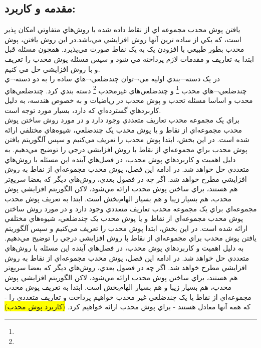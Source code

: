 \documentclass{book}
\begin{document}
\subsection*{مقدمه و کاربرد:}
 يافتن پوش محدب مجموعه اي از  نقاط داده شده با روش‌هاي متفاوتي امکان پذير است، که يکي از ساده ترين آنها روش افزايشي مي‌باشد.در اين روش يافتن، پوش محدب بطور طبيعي با افزودن يک به يک نقاط صورت مي‌پذيرد. همچون مسئله قبل ابتدا به تعاريف و مقدمات لازم پرداخته مي شود و سپس مسئله پوش محدب را تعريف و با روش افزايشي حل مي کنيم.\\
 در يک دسته¬بندي اوليه مي¬توان چندضلعي¬هاي ساده را به دو دسته¬ي چندضلعي¬هاي محدب  
 \footnote{}
 و چندضلعي‌هاي غيرمحدب  
 \footnote{}
 دسته بندي کرد. چندضلعي‌هاي محدب و اساسا مسئله تحدب و پوش محدب در رياضيات و به خصوص هندسه، به دليل کاربردهاي گسترده‌اي که دارد، بسيار مورد توجه است. \\
 براي يک مجموعه محدب تعاريف متعددي وجود دارد و در مورد روش ساختن پوش محدب مجموعه‌اي از نقاط و يا پوش محدب يک چندضلعي، شيوه‌هاي مختلفي ارائه شده است.  در اين بخش، ابتدا پوش محدب را تعريف مي‌کنيم و سپس آلگوريتم يافتن پوش محدب براي مجموعه‌اي از نقاط با روش افزايشي درجي را توضيح مي‌دهيم. به دليل اهميت و کاربردهاي پوش محدب، در فصل‌هاي آينده اين مسئله با روش‌هاي متعددي حل خواهد شد. در ادامه اين فصل، پوش محدب مجموعه‌اي از نقاط به روش افزايشي مطرح خواهد شد. اگر چه در فصول بعدي، روش‌هاي ديگر که بعضا سريع‌تر هم هستند، براي ساختن پوش محدب ارائه مي‌شود، لاکن الگوريتم افزايشي پوش محدب، هم بسيار زيبا و هم بسيار الهام‌بخش است. ابتدا به تعريف پوش محدب مجموعه‌اي براي يک مجموعه محدب تعاريف متعددي وجود دارد و در مورد روش ساختن پوش محدب مجموعه‌اي از نقاط و يا پوش محدب يک چندضلعي، شيوه‌هاي مختلفي ارائه شده است.  در اين بخش، ابتدا پوش محدب را تعريف مي‌کنيم و سپس آلگوريتم يافتن پوش محدب براي مجموعه‌اي از نقاط با روش افزايشي درجي را توضيح مي‌دهيم. به دليل اهميت و کاربردهاي پوش محدب، در فصل‌هاي آينده اين مسئله با روش‌هاي متعددي حل خواهد شد. در ادامه اين فصل، پوش محدب مجموعه‌اي از نقاط به روش افزايشي مطرح خواهد شد. اگر چه در فصول بعدي، روش‌هاي ديگر که بعضا سريع‌تر هم هستند، براي ساختن پوش محدب ارائه مي‌شود، لاکن الگوريتم افزايشي پوش محدب، هم بسيار زيبا و هم بسيار الهام‌بخش است. ابتدا به تعريف پوش محدب مجموعه‌اي از نقاط يا يک چندضلعي غير محدب خواهيم پرداخت و تعاريف متعددي را - که همه آنها معادل هستند - براي پوش محدب ارائه خواهيم کرد.    
\colorbox{yellow}{(کاربرد پوش محدب)}
\end{document}
